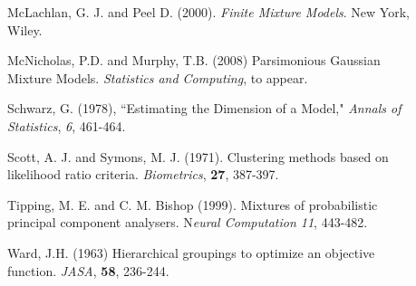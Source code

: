 \begin{description}
\item[    ] McLachlan, G. J. and Peel D. (2000). {\em Finite Mixture Models}. New York, Wiley.
\item[    ] McNicholas, P.D. and Murphy, T.B. (2008) Parsimonious Gaussian Mixture Models. {\em Statistics and Computing}, to appear.
\item[    ] Schwarz, G. (1978), ``Estimating the Dimension of a Model,"
{\em Annals of Statistics}, {\em 6}, 461-464.
\item[    ] Scott, A. J. and Symons, M. J. (1971). Clustering methods
based on likelihood ratio criteria. {\em Biometrics}, {\bf 27}, 387-397.
\item[    ] Tipping, M. E. and C. M. Bishop (1999). Mixtures of probabilistic principal component analysers. N{\em eural Computation  11}, 443-482.
\item[    ]Ward, J.H. (1963) Hierarchical groupings to optimize an objective function. {\em JASA}, {\bf 58}, 236-244.
\end{description}

